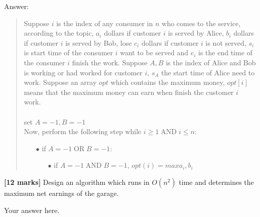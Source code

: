 \documentclass{article}
\DeclareMathOperator{\AND}{AND}
\DeclareMathOperator{\OR}{OR}
\begin{document}
\begin{Question}
\begin{Subquestion}
\begin{answer}
Answer:
\begin{quote}
    Suppose $i$ is the index of any consumer in $n$ who comes to the service, according to the topic, $a_i$ dollars if customer $i$ is served by Alice, $b_i$ dollars if customer $i$ is served by Bob, lose $c_i$ dollars if customer $i$ is not served, $s_i$ is start time of the consumer $i$ want to be served and $e_i$ is the end time of the consumer $i$ finish the work. Suppose $A, B$ is the index of  Alice and Bob is working or had worked for customer $i$, $s_A$ the start time of Alice need to work. Suppose an array $opt$ which contains the maximum money, $opt[i]$ means that the maximum money can earn when finish the customer $i$ work.\\\\
    set $A = -1, B = -1$\\
    Now, perform the following step while $ i \geq 1 \AND i \leq n $:
    \begin{itemize}
        \item [$\bullet$] if $A = -1 \OR B = -1$: \\
            \begin{itemize}
                \item [$\bullet$] if $A = -1 \AND B = -1$, $opt(i) = max{a_i, b_i}$
            \end{itemize}
    \end{itemize}
\end{quote}
\end{answer}
\end{Subquestion}

\begin{Subquestion}
\textbf{[12 marks]} Design an algorithm which runs in $O(n^2)$ time and determines the maximum net earnings of the garage.

\begin{answer}
Your answer here.
\end{answer}
\end{Subquestion}
\end{Question}
\end{document}
